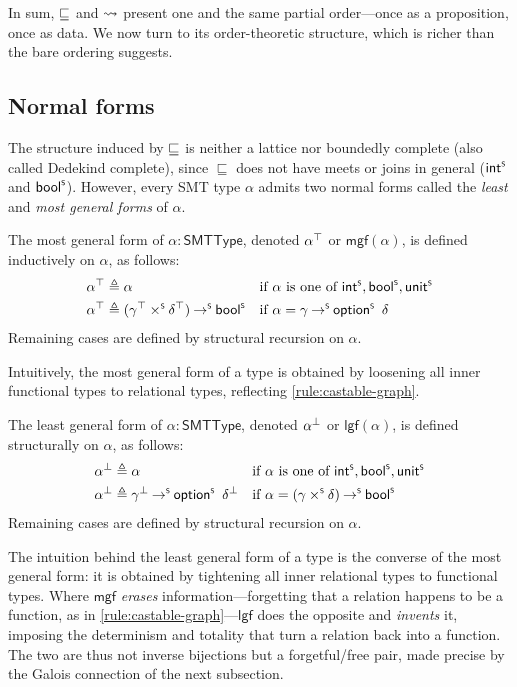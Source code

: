 In sum, $ \sqsubseteq $ and $ \rightsquigarrow $ present one and the same partial order---once as a proposition, once as data. We now turn to its order-theoretic structure, which is richer than the bare ordering suggests.

\subsection{Normal forms}
\label{sec:loosening-normal-forms}

The structure induced by $ \sqsubseteq $ is neither a lattice nor boundedly complete (also called Dedekind complete), since $\sqsubseteq$ does not have meets or joins in general (\eg $\mathsf{int}^{\scriptscriptstyle{\mathsf{S}}}$ and $\mathsf{bool}^{\scriptscriptstyle{\mathsf{S}}}$).
However, every SMT type $\alpha$ admits two normal forms called the \emph{least} and \emph{most general forms} of $\alpha$.

\begin{definition}
  \label{def:mgf}
    The most general form of $\alpha : \mathsf{SMTType}$, denoted ${\alpha}^{\top}$ or $\mathsf{mgf}(\alpha)$, is defined inductively on $\alpha$, as follows:
  \begin{align*}
    {\alpha}^{\top} &\triangleq \alpha &&\text{if \(\alpha\) is one of } \mathsf{int}^{\scriptscriptstyle{\mathsf{S}}}, \mathsf{bool}^{\scriptscriptstyle{\mathsf{S}}}, \mathsf{unit}^{\scriptscriptstyle{\mathsf{S}}}\\
    {\alpha}^{\top} &\triangleq ({\gamma}^{\top} \mathbin{\times^{\scriptscriptstyle{\mathsf{S}}}} {\delta}^{\top}) \mathbin{\to^{\scriptscriptstyle{\mathsf{S}}}} \mathsf{bool}^{\scriptscriptstyle{\mathsf{S}}} &&\text{if \(\alpha = \gamma \mathbin{\ensuremath{\to^{\scriptscriptstyle{\mathsf{S}}}}}\mathord{\ensuremath{\mathsf{option}^{\scriptscriptstyle{\mathsf{S}}}}}\,\ \delta\)}
  \end{align*} 
  Remaining cases are defined by structural recursion on $\alpha$.
\end{definition}
%
Intuitively, the most general form of a type is obtained by loosening all inner functional types to relational types, reflecting \cref{rule:castable-graph}.

\begin{definition}
  \label{def:lgf}
    The least general form of $\alpha : \mathsf{SMTType}$, denoted ${\alpha}^{\bot}$ or $\mathsf{lgf}(\alpha)$, is defined structurally on $\alpha$, as follows:
  \begin{align*}
    {\alpha}^{\bot} &\triangleq \alpha &&\text{if \(\alpha\) is one of } \mathsf{int}^{\scriptscriptstyle{\mathsf{S}}}, \mathsf{bool}^{\scriptscriptstyle{\mathsf{S}}}, \mathsf{unit}^{\scriptscriptstyle{\mathsf{S}}}\\
    {\alpha}^{\bot} &\triangleq {\gamma}^{\bot} \mathbin{\to^{\scriptscriptstyle{\mathsf{S}}}} \mathord{\mathsf{option}^{\scriptscriptstyle{\mathsf{S}}}}\,\ {\delta}^{\bot} &&\text{if \(\alpha = (\gamma \mathbin{\ensuremath{\times^{\scriptscriptstyle{\mathsf{S}}}}}\delta) \mathbin{\ensuremath{\to^{\scriptscriptstyle{\mathsf{S}}}}}\ensuremath{\mathsf{bool}^{\scriptscriptstyle{\mathsf{S}}}}\)}\\
  \end{align*} 
  Remaining cases are defined by structural recursion on $\alpha$.
\end{definition}
%
The intuition behind the least general form of a type is the converse of the most general form: it is obtained by tightening all inner relational types to functional types. Where $\mathsf{mgf}$ \emph{erases} information---forgetting that a relation happens to be a function, as in \cref{rule:castable-graph}---$\mathsf{lgf}$ does the opposite and \emph{invents} it, imposing the determinism and totality that turn a relation back into a function. The two are thus not inverse bijections but a forgetful/free pair, made precise by the Galois connection of the next subsection.

